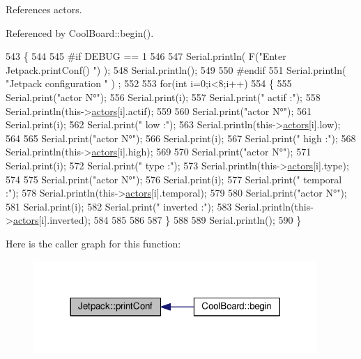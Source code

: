 References actors.



Referenced by Cool\+Board\+::begin().


\begin{DoxyCode}
543 \{
544 
545 \textcolor{preprocessor}{#if DEBUG == 1 }
546 
547     Serial.println( F(\textcolor{stringliteral}{"Enter Jetpack.printConf() "}) );
548     Serial.println();
549 
550 \textcolor{preprocessor}{#endif }
551     Serial.println( \textcolor{stringliteral}{"Jetpack configuration "} ) ;
552  
553         \textcolor{keywordflow}{for}(\textcolor{keywordtype}{int} i=0;i<8;i++)
554     \{   
555         Serial.print(\textcolor{stringliteral}{"actor N°"});
556         Serial.print(i);
557         Serial.print(\textcolor{stringliteral}{" actif :"});
558         Serial.println(this->\hyperlink{classJetpack_a7e16d2f97837f9712a2e6de1c50d99db}{actors}[i].actif);
559 
560         Serial.print(\textcolor{stringliteral}{"actor N°"});
561         Serial.print(i);
562         Serial.print(\textcolor{stringliteral}{" low :"});
563         Serial.println(this->\hyperlink{classJetpack_a7e16d2f97837f9712a2e6de1c50d99db}{actors}[i].low);
564 
565         Serial.print(\textcolor{stringliteral}{"actor N°"});
566         Serial.print(i);
567         Serial.print(\textcolor{stringliteral}{" high :"});
568         Serial.println(this->\hyperlink{classJetpack_a7e16d2f97837f9712a2e6de1c50d99db}{actors}[i].high);
569 
570         Serial.print(\textcolor{stringliteral}{"actor N°"});
571         Serial.print(i);
572         Serial.print(\textcolor{stringliteral}{" type :"});
573         Serial.println(this->\hyperlink{classJetpack_a7e16d2f97837f9712a2e6de1c50d99db}{actors}[i].type);
574         
575         Serial.print(\textcolor{stringliteral}{"actor N°"});
576         Serial.print(i);
577         Serial.print(\textcolor{stringliteral}{" temporal :"});
578         Serial.println(this->\hyperlink{classJetpack_a7e16d2f97837f9712a2e6de1c50d99db}{actors}[i].temporal);
579 
580         Serial.print(\textcolor{stringliteral}{"actor N°"});
581         Serial.print(i);
582         Serial.print(\textcolor{stringliteral}{" inverted :"});
583         Serial.println(this->\hyperlink{classJetpack_a7e16d2f97837f9712a2e6de1c50d99db}{actors}[i].inverted);
584 
585  
586 
587     \}
588 
589     Serial.println();
590 \}
\end{DoxyCode}
Here is the caller graph for this function\+:\nopagebreak
\begin{figure}[H]
\begin{center}
\leavevmode
\includegraphics[width=305pt]{classJetpack_ac54a7bb4f9166bee32052253d9b1d306_icgraph}
\end{center}
\end{figure}
\mbox{\label{classJetpack_a338f1af8cbc6504ac69b47c7328569b5}} 
